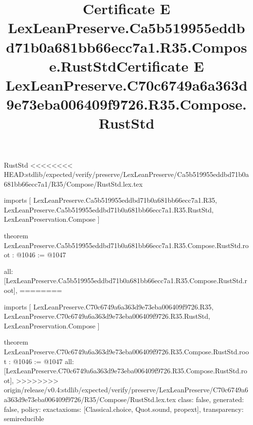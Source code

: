 \begin{lexlean}{RustStd}
<<<<<<<< HEAD:stdlib/expected/verify/preserve/LexLeanPreserve/Ca5b519955eddbd71b0a681bb66ecc7a1/R35/Compose/RustStd.lex.tex
\title{Certificate E LexLeanPreserve.Ca5b519955eddbd71b0a681bb66ecc7a1.R35.Compose.RustStd}
\begin{coremodule}
imports [
  LexLeanPreserve.Ca5b519955eddbd71b0a681bb66ecc7a1.R35,
  LexLeanPreserve.Ca5b519955eddbd71b0a681bb66ecc7a1.R35.RustStd,
  LexLeanPreservation.Compose
]

theorem LexLeanPreserve.Ca5b519955eddbd71b0a681bb66ecc7a1.R35.Compose.RustStd.root : @1046 := @1047 {
  all: [LexLeanPreserve.Ca5b519955eddbd71b0a681bb66ecc7a1.R35.Compose.RustStd.root],
========
\title{Certificate E LexLeanPreserve.C70c6749a6a363d9e73eba006409f9726.R35.Compose.RustStd}
\begin{coremodule}
imports [
  LexLeanPreserve.C70c6749a6a363d9e73eba006409f9726.R35,
  LexLeanPreserve.C70c6749a6a363d9e73eba006409f9726.R35.RustStd,
  LexLeanPreservation.Compose
]

theorem LexLeanPreserve.C70c6749a6a363d9e73eba006409f9726.R35.Compose.RustStd.root : @1046 := @1047 {
  all: [LexLeanPreserve.C70c6749a6a363d9e73eba006409f9726.R35.Compose.RustStd.root],
>>>>>>>> origin/release/v0.4:stdlib/expected/verify/preserve/LexLeanPreserve/C70c6749a6a363d9e73eba006409f9726/R35/Compose/RustStd.lex.tex
  class: false,
  generated: false,
  policy: exact{axioms: [Classical.choice, Quot.sound, propext]},
  transparency: semireducible
}


\end{coremodule}}
\end{coremodule}
\end{lexlean}
